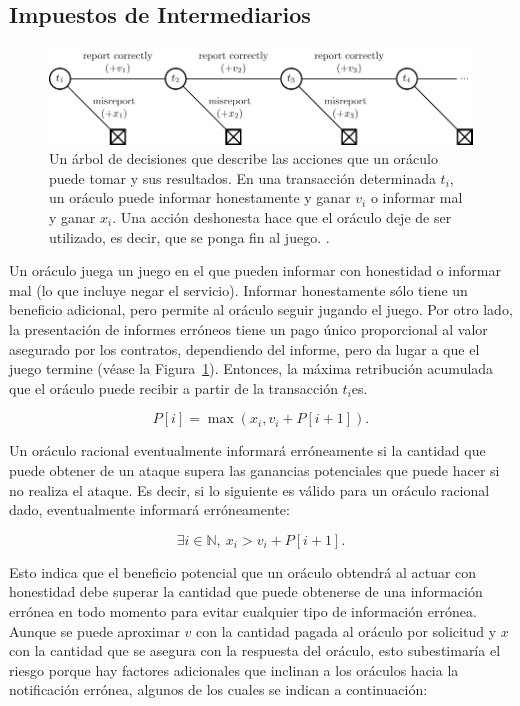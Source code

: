 \documentclass[11pt]{article}
\begin{document}
\subsection{Impuestos de Intermediarios}
\label{sec:middleman-tax}

\begin{figure}
    \centering
	\includegraphics[width=\textwidth]{fig/decision-tree.pdf}
	\caption{Un árbol de decisiones que describe las acciones que un oráculo puede tomar y sus resultados. En una transacción determinada $t_i$, un oráculo puede informar honestamente y ganar $v_i$ o informar mal y ganar $x_i$. Una acción deshonesta hace que el oráculo deje de ser utilizado, es decir, que se ponga fin al juego. .}
	\label{fig:decision-tree}
\end{figure}

Un oráculo juega un juego en el que pueden informar con honestidad o informar mal (lo que incluye negar el servicio). Informar honestamente sólo tiene un beneficio adicional, pero permite al oráculo seguir jugando el juego. Por otro lado, la presentación de informes erróneos tiene un pago único proporcional al valor asegurado por los contratos, dependiendo del informe, pero da lugar a que el juego termine  (véase la Figura~\ref{fig:decision-tree}).
Entonces, la máxima retribución acumulada que el oráculo puede recibir a partir de la transacción $t_i$es. 

\begin{equation}
P \left[ i \right] = \max \left( x_i, v_i + P \left[ i + 1 \right] \right).
\end{equation}

Un oráculo racional eventualmente informará erróneamente si la cantidad que puede obtener de un ataque supera las ganancias potenciales que puede hacer si no realiza el ataque. Es decir, si lo siguiente es válido para un oráculo racional dado, eventualmente informará erróneamente:

\begin{equation}
\exists i \in \mathbb{N},~ x_i > v_i + P \left[ i + 1 \right].
\end{equation}

Esto indica que el beneficio potencial que un oráculo obtendrá al actuar con honestidad debe superar la cantidad que puede obtenerse de una información errónea en todo momento para evitar cualquier tipo de información errónea. Aunque se puede aproximar $v$ con la cantidad pagada al oráculo por solicitud y $x$ con la cantidad que se asegura con la respuesta del oráculo, esto subestimaría el riesgo porque hay factores adicionales que inclinan a los oráculos hacia la notificación errónea, algunos de los cuales se indican a continuación:
\end{document}

